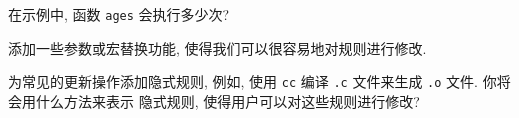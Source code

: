 \begin{exercise}
    在示例中, 函数 \texttt{ages} 会执行多少次?
\end{exercise}

\begin{exercise}
    添加一些参数或宏替换功能, 使得我们可以很容易地对规则进行修改.
\end{exercise}

\begin{exercise}
    为常见的更新操作添加隐式规则, 例如, 使用 \texttt{cc} 编译 
    \texttt{.c} 文件来生成 \texttt{.o} 文件. 你将会用什么方法来表示
    隐式规则, 使得用户可以对这些规则进行修改?
\end{exercise}
